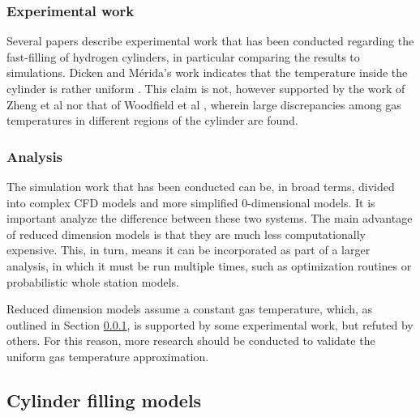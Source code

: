 \subsubsection{Experimental work}
\label{sec:experimental_work}
Several papers describe experimental work that has been conducted regarding the fast-filling of hydrogen cylinders, in particular comparing the results to simulations. Dicken and M\'erida's work indicates that the temperature inside the cylinder is rather uniform \cite{Dicken2007}. This claim is not, however supported by the work of Zheng et al  nor that of Woodfield et al \cite{Woodfield2008}, wherein large discrepancies among gas temperatures in different regions of the cylinder are found.

\subsubsection{Analysis}


The simulation work that has been conducted can be, in broad terms, divided into complex CFD models and more simplified 0-dimensional models. It is important analyze the difference between these two systems. The main advantage of reduced dimension models is that they are much less computationally expensive. This, in turn, means it can be incorporated as part of a larger analysis, in which it must be run multiple times, such as optimization routines or probabilistic whole station models.

Reduced dimension models assume a constant gas temperature, which, as outlined in Section \ref{sec:experimental_work}, is supported by some experimental work, but refuted by others. For this reason, more research should be conducted to validate the uniform gas temperature approximation.


\subsection{Cylinder filling models}

